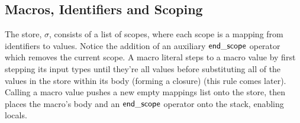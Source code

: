 \documentclass[acmsmall, review]{acmart}
\theoremstyle{definition}
\begin{document}
\subsection{Macros, Identifiers and Scoping}
The store, $\sigma$, consists of a list of scopes, where each scope is a mapping from identifiers to values. Notice the addition of an auxiliary $\mathsf{end\_scope}$ operator which removes the current scope. A macro literal steps to a macro value by first stepping its input types until they're all values before substituting all of the values in the store within its body (forming a closure) (this rule comes later). Calling a macro value pushes a new empty mappings list onto the store, then places the macro's body and an $\mathsf{end\_scope}$ operator onto the stack, enabling locals.
{
    \centering
    \def \MathparLineskip {\lineskip=0.43cm}
}
\end{document}
